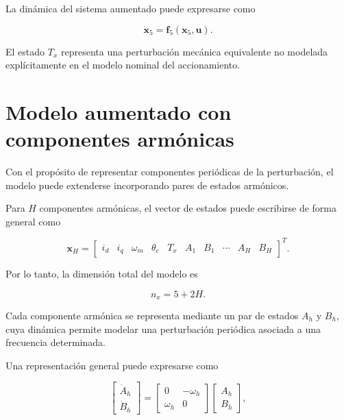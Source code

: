 La dinámica del sistema aumentado puede expresarse como

\begin{equation}
    \dot{\mathbf{x}}_5 =
    \mathbf{f}_5(\mathbf{x}_5,\mathbf{u}).
\end{equation}

El estado $T_x$ representa una perturbación mecánica equivalente no
modelada explícitamente en el modelo nominal del accionamiento.

%


\section{Modelo aumentado con componentes armónicas}
\label{anexo:modelo_armonico}

Con el propósito de representar componentes periódicas de la
perturbación, el modelo puede extenderse incorporando pares de estados
armónicos.

Para $H$ componentes armónicas, el vector de estados puede escribirse
de forma general como

\begin{equation}
    \mathbf{x}_{H} =
    \begin{bmatrix}
        i_d &
        i_q &
        \omega_m &
        \theta_e &
        T_x &
        A_1 &
        B_1 &
        \cdots &
        A_H &
        B_H
    \end{bmatrix}^{T}.
\end{equation}

Por lo tanto, la dimensión total del modelo es

\begin{equation}
    n_x = 5 + 2H.
\end{equation}

Cada componente armónica se representa mediante un par de estados
$A_h$ y $B_h$, cuya dinámica permite modelar una perturbación
periódica asociada a una frecuencia determinada.

Una representación general puede expresarse como

\begin{equation}
    \begin{bmatrix}
        \dot{A}_h \\
        \dot{B}_h
    \end{bmatrix}
    =
    \begin{bmatrix}
        0 & -\omega_h \\
        \omega_h & 0
    \end{bmatrix}
    \begin{bmatrix}
        A_h \\
        B_h
    \end{bmatrix},
\end{equation}

